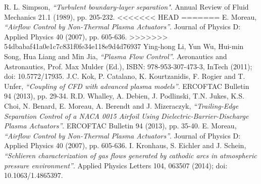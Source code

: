 \documentclass[10pt,a4paper]{article}
\begin{document}
\begin{thebibliography}{99}

	R. L. Simpson, \emph{``Turbulent boundary-layer separation"}. Annual Review of Fluid Mechanics 21.1 (1989), pp. 205-232.‏
<<<<<<< HEAD
=======
	E. Moreau, \emph{ ``Airflow Control by Non-Thermal Plasma Actuators''}. Journal of Physics D: Applied Physics 40 (2007), pp. 605-636.
>>>>>>> 54dbabaf41a0e1c7c831f0fe34e118e9d4d76937
	Ying-hong Li, Yun Wu, Hui-min Song, Hua Liang and Min Jia, \emph{``Plasma Flow Control''}. Aeronautics and Astronautics, Prof. Max Mulder (Ed.), ISBN: 978-953-307-473-3, InTech (2011); doi: 10.5772/17935. 
	J.C. Kok, P. Catalano, K. Kourtzanidis, F. Rogier and T. Unfer, \emph{``Coupling of CFD with advanced plasma models''}. ERCOFTAC Bulletin 94 (2013), pp. 29-34.
	R.D. Whalley, A. Debien, J. Podlinski, T.N. Jukes, K.S. Choi, N. Benard, E. Moreau, A. Berendt and J. Mizeraczyk, \emph{``Trailing-Edge Separation Control of a NACA 0015 Airfoil Using Dielectric-Barrier-Discharge Plasma Actuators''}. ERCOFTAC Bulletin 94 (2013), pp. 35-40.
	E. Moreau, \emph{ ``Airflow Control by Non-Thermal Plasma Actuators''}. Journal of Physics D: Applied Physics 40 (2007), pp. 605-636.
	I. Kronhaus, S. Eichler and J. Schein,
	\emph{``Schlieren characterization of gas flows generated by cathodic arcs in atmospheric pressure environment”}. Applied Physics Letters 104, 063507 (2014); doi: 10.1063/1.4865397.
  

\end{thebibliography}
\end{document}

